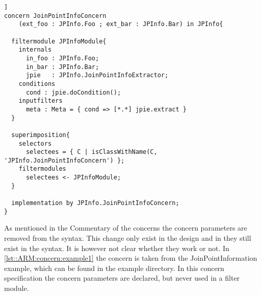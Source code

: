 \begin{lstlisting}[caption={JoinPointInfoConcern from the JoinPointInformation example },label=lst::ARM:concern:example1,style=listing,language=ComposeStar,float=[tpb]]
concern JoinPointInfoConcern
    (ext_foo : JPInfo.Foo ; ext_bar : JPInfo.Bar) in JPInfo{

  filtermodule JPInfoModule{
    internals
      in_foo : JPInfo.Foo;
      in_bar : JPInfo.Bar;
      jpie   : JPInfo.JoinPointInfoExtractor;
    conditions
      cond : jpie.doCondition();
    inputfilters
      meta : Meta = { cond => [*.*] jpie.extract }
  }

  superimposition{
    selectors
      selectees = { C | isClassWithName(C, 'JPInfo.JoinPointInfoConcern') };
    filtermodules
      selectees <- JPInfoModule;
  }

  implementation by JPInfo.JoinPointInfoConcern;
}
\end{lstlisting}
As mentioned in the Commentary of the concerns the concern parameters are removed from the \Compose* syntax.
This change only exist in the design and in \Compose*[DOTNet] they still exist in the syntax. It is however not clear
whether they work or not. In \autoref{lst::ARM:concern:example1} the concern is taken from the JoinPointInformation example,
which can be found in the \Compose* example directory. In this concern specification the concern parameters are declared, but never used in a filter module.